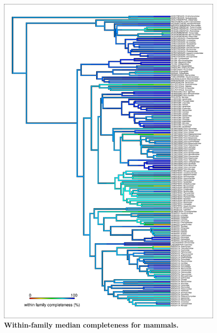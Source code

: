 \documentclass[11pt]{article}
\begin{document}
\begin{figure}[h!]
\centering
\includegraphics[scale=0.55]{figures/NA_phylo_patterns/Mammals_completeness}
\caption[Within-family median completeness for mammals]{\textbf{Within-family median completeness for mammals.}}
\label{}
\end{figure}

\pagebreak
\end{document}
